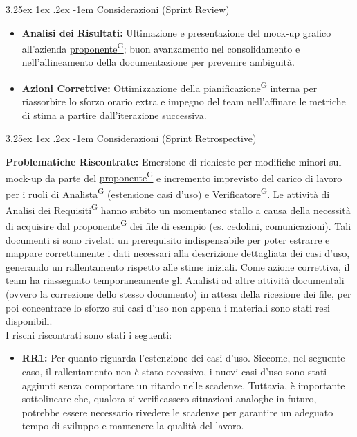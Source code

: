 \documentclass[a4paper,12pt]{article}
\makeatletter
\renewcommand\paragraph{\@startsection{paragraph}{5}{\z@}%
  {3.25ex \@plus1ex \@minus.2ex}%
  {-1em}%
  {\normalfont\normalsize\bfseries}}
\providecommand{\glslink}[2]{\href{https://alittlebyte-19.github.io/Documentazione/glossario.html\#gls-#1}{\underline{#2}\textsuperscript{\scriptsize G}}}
\makeatother
\begin{document}
\paragraph{Considerazioni (Sprint Review)}
\begin{itemize}
    \item \textbf{Analisi dei Risultati:} Ultimazione e presentazione del mock-up grafico all'azienda \glslink{committente-proponente}{proponente}; buon avanzamento nel consolidamento e nell'allineamento della documentazione per prevenire ambiguità.
    \item \textbf{Azioni Correttive:} Ottimizzazione della \glslink{pianificazione}{pianificazione} interna per riassorbire lo sforzo orario extra e impegno del team nell'affinare le metriche di stima a partire dall'iterazione successiva.
\end{itemize}

\paragraph{Considerazioni (Sprint Retrospective)}

\textbf{Problematiche Riscontrate:} Emersione di richieste per modifiche minori sul mock-up da parte del \glslink{committente-proponente}{proponente} e incremento imprevisto del carico di lavoro per i ruoli di \glslink{analista}{Analista} (estensione casi d'uso) e \glslink{verificatore}{Verificatore}. Le attività di \glslink{analisi-dei-requisiti-adr}{Analisi dei Requisiti} hanno subito un momentaneo stallo a causa della necessità di acquisire dal \glslink{committente-proponente}{proponente} dei file di esempio (es. cedolini, comunicazioni). Tali documenti si sono rivelati un prerequisito indispensabile per poter estrarre e mappare correttamente i dati necessari alla descrizione dettagliata dei casi d'uso, generando un rallentamento rispetto alle stime iniziali.
Come azione correttiva, il team ha riassegnato temporaneamente gli Analisti ad altre attività documentali (ovvero la correzione dello stesso documento) in attesa della ricezione dei file, per poi concentrare lo sforzo sui casi d'uso non appena i materiali sono stati resi disponibili.\\

I rischi riscontrati sono stati i seguenti:
\begin{itemize}
    \item \textbf{RR1:} Per quanto riguarda l'estenzione dei casi d'uso. Siccome, nel seguente caso, il rallentamento non è stato eccessivo, i nuovi casi d'uso sono stati aggiunti senza comportare un ritardo nelle scadenze. Tuttavia, è importante sottolineare che, qualora si verificassero situazioni analoghe in futuro, potrebbe essere necessario rivedere le scadenze per garantire un adeguato tempo di sviluppo e mantenere la qualità del lavoro.
\end{itemize}
\newpage
\end{document}

